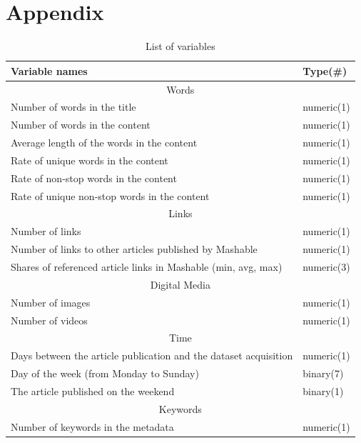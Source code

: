 \documentclass[12pt]{article}
\begin{document}
\section{Appendix}
\singlespacing
    \begin{table}[h]
        \centering
        \footnotesize
        \caption{List of variables}
        \begin{tabular}{ l | l }
            \hline\hline
            Variable names & Type(\#)\\
            \hline
            \multicolumn{2}{c}{Words}\\
            \hline
            Number of words in the title & numeric(1) \\
            Number of words in the content & numeric(1) \\
            Average length of the words in the content & numeric(1) \\
            Rate of unique words in the content & numeric(1) \\
            Rate of non-stop words in the content & numeric(1) \\
            Rate of unique non-stop words in the content & numeric(1) \\
            \hline
            \multicolumn{2}{c}{Links}\\
            \hline
            Number of links & numeric(1) \\
            Number of links to other articles published by Mashable & numeric(1) \\
            Shares of referenced article links in Mashable (min, avg, max) & numeric(3) \\
            \hline
            \multicolumn{2}{c}{Digital Media}\\
            \hline
            Number of images & numeric(1) \\
            Number of videos & numeric(1) \\
            \hline
            \multicolumn{2}{c}{Time}\\
            \hline
            Days between the article publication and the dataset acquisition & numeric(1) \\
            Day of the week (from Monday to Sunday) & binary(7) \\
            The article published on the weekend & binary(1) \\
            \hline
            \multicolumn{2}{c}{Keywords}\\
            \hline
            Number of keywords in the metadata & numeric(1) \\

\end{tabular}
\end{table}
\end{document}
